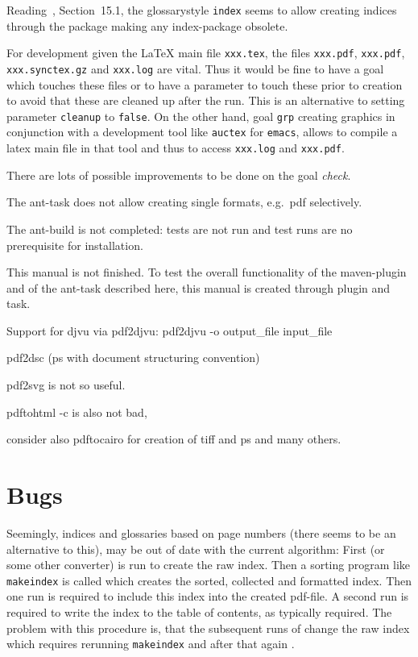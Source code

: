 \documentclass[a4paper,12pt]{book}
\begin{document}
Reading~\cite{GloP}, Section~15.1, the glossarystyle \texttt{index} 
seems to allow creating indices through the  package 
making any index-package obsolete. 

For development given the \LaTeX{} main file \texttt{xxx.tex}, 
the files \texttt{xxx.pdf}, \texttt{xxx.pdf}, \texttt{xxx.synctex.gz} 
and \texttt{xxx.log} are vital. 
Thus it would be fine to have a goal which touches these files 
or to have a parameter to touch these prior to creation 
to avoid that these are cleaned up after the run. 
This is an alternative to setting parameter \texttt{cleanup} to \texttt{false}. 
On the other hand, goal \texttt{grp} creating graphics 
in conjunction with a development tool like \texttt{auctex} for \texttt{emacs}, 
allows to compile a latex main file in that tool 
and thus to access \texttt{xxx.log} and \texttt{xxx.pdf}. 

There are lots of possible improvements to be done on the goal \emph{check}. 


The ant-task does not allow creating single formats, e.g.~pdf selectively. 

The ant-build is not completed: tests are not run and 
test runs are no prerequisite for installation. 

This manual is not finished. 
To test the overall functionality of the maven-plugin and of the ant-task 
described here, this manual is created through plugin and task. 

Support for djvu via pdf2djvu: 
pdf2djvu -o output\_file input\_file

pdf2dsc
(ps with document structuring convention) 

pdf2svg is not so useful. 

pdftohtml -c is also not bad, 

consider also pdftocairo for creation of tiff and ps and many others. 

\chapter{Bugs}\label{chap:bugs}

Seemingly, indices and glossaries based on page numbers 
(there seems to be an alternative to this), 
may be out of date with the current algorithm: 
First \lualatex{} (or some other converter) is run to create the raw index. 
Then a sorting program like \texttt{makeindex} is called 
which creates the sorted, collected and formatted index. 
Then one \lualatex{} run is required to include this index 
into the created pdf-file. 
A second \lualatex{} run is required 
to write the index to the table of contents, as typically required. 
The problem with this procedure is, 
that the subsequent runs of \lualatex{} change the raw index 
which requires rerunning \texttt{makeindex} 
and after that again \lualatex. 
\end{document}
